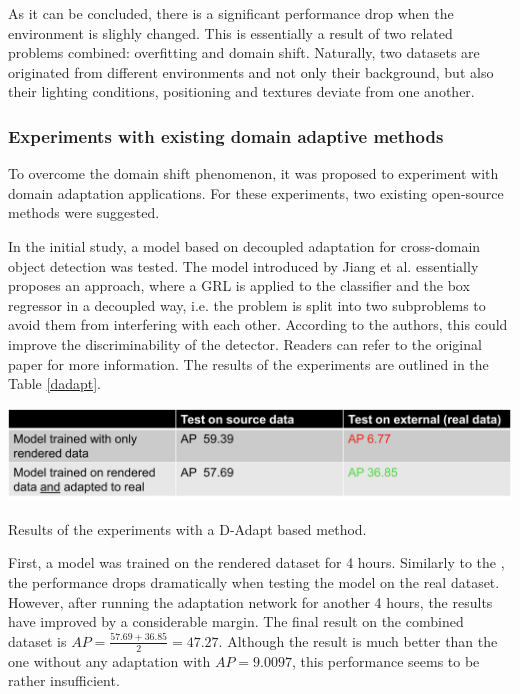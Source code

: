 \documentclass[english, 12pt, a4paper, elec, utf8, a-1b, online]{aaltothesis}
\begin{document}
As it can be concluded, there is a significant performance drop when the environment is slighly changed. This is essentially a result of two related problems combined: overfitting and domain shift. Naturally, two datasets are originated from different environments and not only their background, but also their lighting conditions, positioning and textures deviate from one another. 

\subsubsection{Experiments with existing domain adaptive methods}
To overcome the domain shift phenomenon, it was proposed to experiment with domain adaptation applications. For these experiments, two existing open-source methods were suggested. 

In the initial study, a model based on decoupled adaptation for cross-domain object detection \cite{Jiang2021} was tested. The model introduced by Jiang et al. essentially proposes an  approach, where a GRL is applied to the classifier and the box regressor in a decoupled way, i.e. the problem is split into two subproblems to avoid them from interfering with each other. According to the authors, this could improve the discriminability of the detector. Readers can refer to the original paper \cite{Jiang2021} for more information. The results of the experiments are outlined in the Table \ref{dadapt}.

\begin{table}[htb]
	\begin{center}
		\includegraphics[width=14cm]{./dadapt.png}
	\end{center}
	\caption{Results of the experiments with a D-Adapt based method.}
	\begin{center}
		\label{dadapt}
	\end{center}
\end{table}
\FloatBarrier

First, a model was trained on the rendered dataset for 4 hours. Similarly to the , the performance drops dramatically when testing the model on the real dataset. However, after running the adaptation network for another 4 hours, the results have improved by a considerable margin. The final result on the combined dataset is $AP = \frac{57.69+36.85}{2} = 47.27$. Although the result is much better than the one without any adaptation with $AP = 9.0097$, this performance seems to be rather insufficient. 
\end{document}
